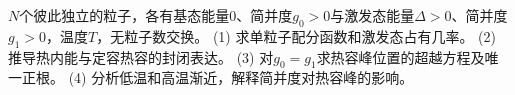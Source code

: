 \(N\)个彼此独立的粒子，各有基态能量0、简并度\(g_0>0\)与激发态能量\(\Delta>0\)、简并度\(g_1>0\)，温度\(T\)，无粒子数交换。
(1) 求单粒子配分函数和激发态占有几率。
(2) 推导热内能与定容热容的封闭表达。
(3) 对\(g_0=g_1\)求热容峰位置的超越方程及唯一正根。
(4) 分析低温和高温渐近，解释简并度对热容峰的影响。
